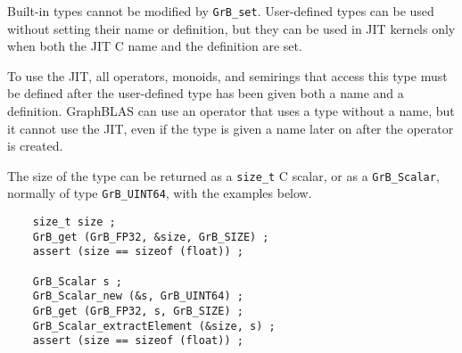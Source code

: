 Built-in types cannot be modified by \verb'GrB_set'.  User-defined types can be
used without setting their name or definition, but they can be used in JIT
kernels only when both the JIT C name and the definition are set.

To use the JIT, all operators, monoids, and semirings that access this type
must be defined after the user-defined type has been given both a name and a
definition.  GraphBLAS can use an operator that uses a type without a name,
but it cannot use the JIT, even if the type is given a name later on after
the operator is created.

The size of the type can be returned as a \verb'size_t' C scalar, or as a
\verb'GrB_Scalar', normally of type \verb'GrB_UINT64', with the examples below.

{\footnotesize
\begin{verbatim}
    size_t size ;
    GrB_get (GrB_FP32, &size, GrB_SIZE) ;
    assert (size == sizeof (float)) ;

    GrB_Scalar s ;
    GrB_Scalar_new (&s, GrB_UINT64) ;
    GrB_get (GrB_FP32, s, GrB_SIZE) ;
    GrB_Scalar_extractElement (&size, s) ;
    assert (size == sizeof (float)) ; \end{verbatim}}

